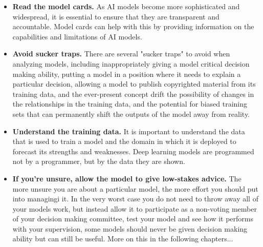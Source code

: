 \begin{itemize}
    \item \textbf{Read the model cards.} As AI models become more sophisticated and widespread, it is essential to ensure that they are transparent and accountable. Model cards can help with this by providing information on the capabilities and limitations of AI models.
    \item \textbf{Avoid sucker traps.} There are several "sucker traps" to avoid when analyzing models, including inappropriately giving a model critical decision making ability, putting a model in a position where it needs to explain a particular decision, allowing a model to publish copyrighted material from its training data, and the ever-present concept drift the possibility of changes in the relationships in the training data, and the potential for biased training sets that can permanently shift the outputs of the model away from reality.
    \item \textbf{Understand the training data.} It is important to understand the data that is used to train a model and the domain in which it is deployed to forecast its strengths and weaknesses. Deep learning models are programmed not by a programmer, but by the data they are shown.
    \item \textbf{If you're unsure, allow the model to give low-stakes advice.} The more unsure you are about a particular model, the more effort you should put into managingi it. In the very worst case you do not need to throw away all of your models work, but instead allow it to participate as a non-voting member of your decision making committee, test your model and see how it performs with your supervision, some models should never be given decision making ability but can still be useful. More on this in the following chapters...
\end{itemize}
